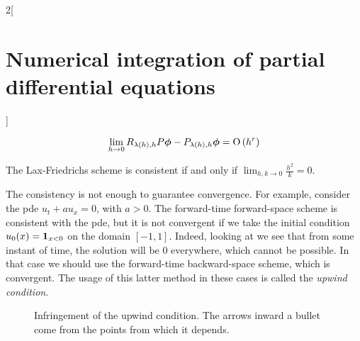 \documentclass[../../../main_math.tex]{subfiles}
\begin{document}
\begin{multicols}{2}[\section{Numerical integration of partial differential equations}]
\begin{definition}
    $$\lim_{h\to 0}R_{\lambda(h),h}P\boldsymbol{\mathrm{\phi}}-P_{\lambda(h),h}\boldsymbol{\mathrm{\phi}}=\mathrm{O}\left(h^r\right)$$
  \end{definition}
  \begin{lemma}
    The Lax-Friedrichs scheme is consistent if and only if $\displaystyle\lim_{h,k\to 0}\frac{h^2}{k}=0$.
  \end{lemma}
  \begin{remark}
    The consistency is not enough to guarantee convergence. For example, consider the pde $u_t+au_x=0$, with $a>0$. The forward-time forward-space scheme is consistent with the pde, but it is not convergent if we take the initial condition $u_0(x)=\boldsymbol{\mathrm{1}}_{x<0}$ on the domain $[-1,1]$. Indeed, looking at  we see that from some instant of time, the solution will be $0$ everywhere, which cannot be possible. In that case we should use the forward-time backward-space scheme, which is convergent. The usage of this latter method in these cases is called the \emph{upwind condition}.
  \end{remark}
  \begin{figure}[H]
    \centering
    
    \caption{Infringement of the upwind condition. The arrows inward a bullet come from the points from which it depends.}
    \label{NIPDE:upwind}
  \end{figure}

\end{multicols}
\end{document}

